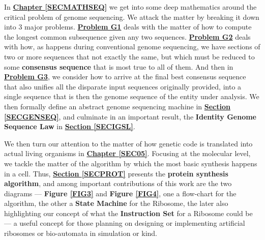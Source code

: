 \documentclass[a4paper, 18pt]{book} %
\begin{document}
In \textbf{\hyperref[SECMATHSEQ]{Chapter \ref{SECMATHSEQ}}} we get into some deep mathematics around the critical problem of genome sequencing. We attack the matter by breaking it down into 3 major problems. \textbf{\hyperref[PROBG1]{Problem G1}} deals with the matter of how to compute the longest common subsequence given any two sequences. \textbf{\hyperref[PROBG2]{Problem G2}} deals with how, as happens during conventional genome sequencing, we have sections of two or more sequences that not exactly the same, but which must be reduced to some \textbf{consensus sequence} that is most true to all of them. And then in \textbf{\hyperref[SECCOMPGENSEQ]{Problem G3}}, we consider how to arrive at the final best consensus sequence that also unifies all the disparate input sequences originally provided, into a single sequence that is then the genome sequence of the entity under analysis. We then formally define an abstract genome sequencing machine in \textbf{\hyperref[SECGENSEQ]{Section \ref{SECGENSEQ}}}, and culminate in an important result, the \textbf{Identity Genome Sequence Law} in \textbf{\hyperref[SECIGSL]{Section \ref{SECIGSL}}}.


We then turn our attention to the matter of how genetic code is translated into actual living organisms in \textbf{\hyperref[SEC05]{Chapter \ref{SEC05}}}. Focusing at the molecular level, we tackle the matter of the algorithm by which the most basic synthesis happens in a cell. Thus, \textbf{\hyperref[SECPROT]{Section \ref{SECPROT}}} presents the \textbf{protein synthesis  algorithm}, and among important contributions of this work are the two diagrams --- \textbf{Figure \ref{FIG3}} and \textbf{Figure \ref{FIG4}}, one a flow-chart for the algorithm, the other a \textbf{State Machine} for the Ribosome, the later also highlighting our concept of what the \textbf{Instruction Set} for a Ribosome could be --- a useful concept for those planning on designing or implementing artificial ribosomes or bio-automata in simulation or kind.
\end{document}
